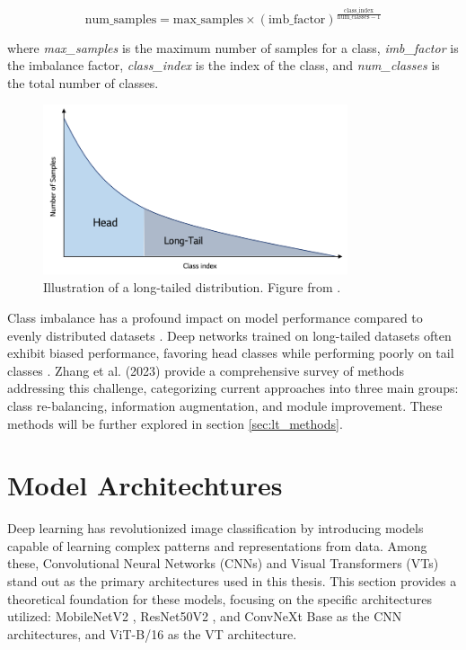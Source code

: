 \begin{equation}
    \label{eq:pareto}
\text{num\_samples} = \text{max\_samples} \times (\text{imb\_factor})^{\frac{\text{class\_index}}{\text{num\_classes} - 1}}
\end{equation}

where \textit{max\_samples} is the maximum number of samples for a class, \textit{imb\_factor} is the imbalance factor, \textit{class\_index} is the index of the class, and \textit{num\_classes} is the total number of classes.
 

\begin{figure}[ht]
    \centering
    \includegraphics[width=0.8\textwidth]{Images/long_tail_distribution.png} 
    \caption{Illustration of a long-tailed distribution. Figure from \cite{lgresearch257}.}
    \label{fig:lt_distribution} %
\end{figure}

Class imbalance has a profound impact on model performance compared to evenly distributed datasets \cite{vanhorn2017deviltailsfinegrainedclassification, cui2019classbalancedlossbasedeffective}. Deep networks trained on long-tailed datasets often exhibit biased performance, favoring head classes while performing poorly on tail classes \cite{zhang2023deep}. Zhang et al. (2023) provide a comprehensive survey of methods addressing this challenge, categorizing current approaches into three main groups: class re-balancing, information augmentation, and module improvement. These methods will be further explored in section \ref{sec:lt_methods}. 



\section{Model Architechtures}
Deep learning has revolutionized image classification by introducing models capable of learning complex patterns and representations from data. Among these, Convolutional Neural Networks (CNNs) and Visual Transformers (VTs) stand out as the primary architectures used in this thesis. This section provides a theoretical foundation for these models, focusing on the specific architectures utilized: MobileNetV2 \cite{sandler2018mobilenetv2}, ResNet50V2 \cite{he2016}, and ConvNeXt Base \cite{todi2023convnext} as the CNN architectures, and ViT-B/16 \cite{dosovitskiy2021imageworth16x16words} as the VT architecture.

